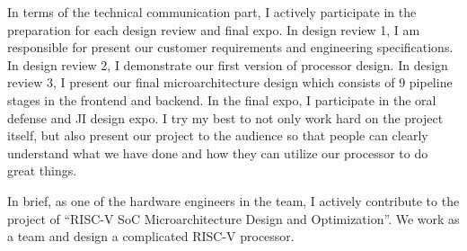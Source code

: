 In terms of the technical communication part, I actively participate in the preparation for each design review and final expo. In design review 1, I am responsible for present our customer requirements and engineering specifications. In design review 2, I demonstrate our first version of processor design. In design review 3, I present our final microarchitecture design which consists of 9 pipeline stages in the frontend and backend. In the final expo, I participate in the oral defense and JI design expo. I try my best to not only work hard on the project itself, but also present our project to the audience so that people can clearly understand what we have done and how they can utilize our processor to do great things.

In brief, as one of the hardware engineers in the team, I actively contribute to the project of ``RISC-V SoC Microarchitecture Design and Optimization''. We work as a team and design a complicated RISC-V processor.
